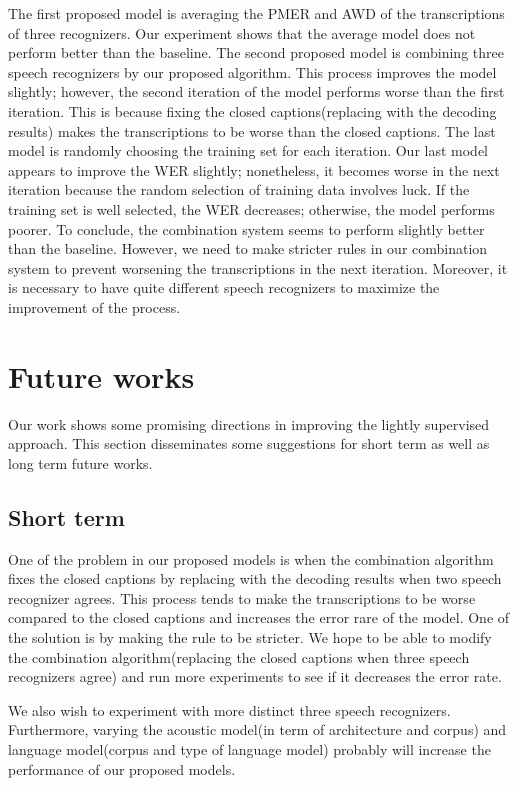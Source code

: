 The first proposed model is averaging the PMER and AWD of the transcriptions of three recognizers. Our experiment shows that the average model does not perform better than the baseline. The second proposed model is combining  three speech recognizers by our proposed algorithm. This process improves the model slightly; however, the second iteration of the model performs worse than the first iteration. This is because fixing the closed captions(replacing with the decoding results) makes the transcriptions to be worse than the closed captions. The last model is randomly choosing the training set for each iteration. Our last model appears to improve the WER slightly; nonetheless, it becomes worse in the next iteration because the random selection of training data involves luck. If the training set is well selected, the WER decreases; otherwise, the model performs poorer. To conclude, the combination system seems to perform slightly better than the baseline. However, we need to make stricter rules in our combination system to prevent worsening the transcriptions in the next iteration. Moreover, it is necessary to have quite different speech recognizers to maximize the improvement of the process.



\section{Future works}
Our work shows some promising directions in improving the lightly supervised approach. This section disseminates some suggestions for short term as well as long term future works.

\subsection{Short term}
One of the problem in our proposed models is when the combination algorithm fixes the closed captions by replacing with the decoding results when two speech recognizer agrees. This process tends to make the transcriptions to be worse compared to the closed captions and increases the error rare of the model. One of the solution is by making the rule to be stricter. We hope to be able to modify the combination algorithm(replacing the closed captions when three speech recognizers agree) and run more experiments to see if it decreases the error rate.

We also wish to experiment with more distinct three speech recognizers. Furthermore, varying the acoustic model(in term of architecture and corpus) and language model(corpus and type of language model) probably will increase the performance of our proposed models. 


